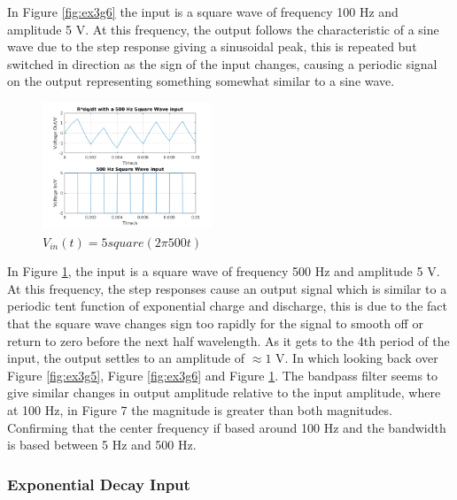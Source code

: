 \documentclass[11pt,a4paper]{article}
\begin{document}
\vspace{5mm}In Figure \ref{fig:ex3g6} the input is a square wave of frequency 100 Hz and amplitude 5 V. At this frequency, the output follows the characteristic of a sine wave due to the step response giving a sinusoidal peak, this is repeated but switched in direction as the sign of the input changes, causing a periodic signal on the output representing something somewhat similar to a sine wave.

\begin{figure}
    \vspace{-5mm}
  		\includegraphics[width=0.45\textwidth]{Ex3_Figs/500Squ1.png}
	\vspace{-3mm}
  	\caption{$V_{in}(t)= 5square(2 \pi 500t)$}
  	\label{fig:ex3g7}
\end{figure}

\vspace{5mm}In Figure \ref{fig:ex3g7}, the input is a square wave of frequency 500 Hz and amplitude 5 V. At this frequency, the step responses cause an output signal which is similar to a periodic tent function of exponential charge and discharge, this is due to the fact that the square wave changes sign too rapidly for the signal to smooth off or return to zero before the next half wavelength. As it gets to the 4th period of the input, the output settles to an amplitude of $\approx 1$ V. In which looking back over Figure \ref{fig:ex3g5}, Figure \ref{fig:ex3g6} and Figure \ref{fig:ex3g7}. The bandpass filter seems to give similar changes in output amplitude relative to the input amplitude, where at 100 Hz, in Figure 7 the magnitude is greater than both magnitudes. Confirming that the center frequency if based around 100 Hz and the bandwidth is based between 5 Hz and 500 Hz.

\subsubsection{Exponential Decay Input}
\end{document}
